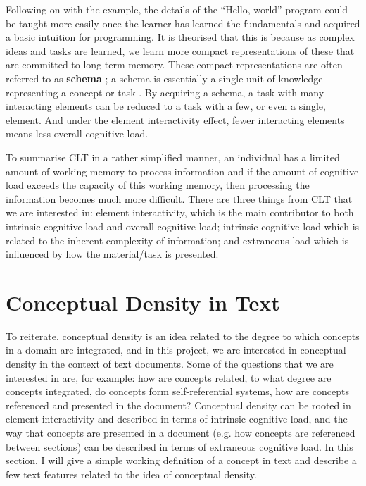 \documentclass[12pt]{article}
\theoremstyle{grammarstyle}
\newcommand{\keyword}[1]{%
    \textbf{#1}%
}
\begin{document}
Following on with the example, the details of the ``Hello, world'' program could be taught more easily once the learner has learned the fundamentals and acquired a basic intuition for programming. It is theorised that this is because as complex ideas and tasks are learned, we learn more compact representations of these that are committed to long-term memory. These compact representations are often referred to as \keyword{schema}; a schema is essentially a single unit of knowledge representing a concept or task \citep{axelrod1973schema, abelson1981psychological, bartlett1995remembering}. By acquiring a schema, a task with many interacting elements can be reduced to a task with a few, or even a single, element. And under the element interactivity effect, fewer interacting elements means less overall cognitive load. 

To summarise CLT in a rather simplified manner, an individual has a limited amount of working memory to process information and if the amount of cognitive load exceeds the capacity of this working memory, then processing the information becomes much more difficult. There are three things from CLT that we are interested in: element interactivity, which is the main contributor to both intrinsic cognitive load and overall cognitive load; intrinsic cognitive load which is related to the inherent complexity of information; and extraneous load which is influenced by how the material/task is presented.

\section{Conceptual Density in Text} \label{sec:conceptual_density_in_text}
To reiterate, conceptual density is an idea related to the degree to which concepts in a domain are integrated, and in this project, we are interested in conceptual density in the context of text documents. Some of the questions that we are interested in are, for example: how are concepts related, to what degree are concepts integrated, do concepts form self-referential systems, how are concepts referenced and presented in the document? Conceptual density can be rooted in element interactivity and described in terms of intrinsic cognitive load, and the way that concepts are presented in a document (e.g. how concepts are referenced between sections) can be described in terms of extraneous cognitive load. In this section, I will give a simple working definition of a concept in text and describe a few text features related to the idea of conceptual density.
\end{document}
